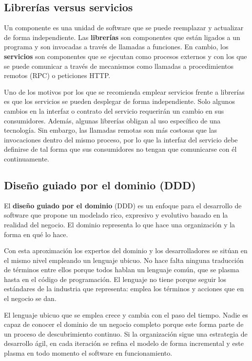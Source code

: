 \documentclass[11pt,spanish,listoffigures,listoftables]{tfgetsinf}
\begin{document}
\subsection{Librerías versus servicios}

Un componente es una unidad de software que se puede reemplazar y actualizar de forma independiente. Las \textbf{librerías} son componentes que están ligados a un programa y son invocadas a través de llamadas a funciones. En cambio, los \textbf{servicios} son componentes que se ejecutan como procesos externos y con los que se puede comunicar a través de mecanismos como llamadas a procedimientos remotos (RPC) o peticiones HTTP. \cite{Lewis2014}

Uno de los motivos por los que se recomienda emplear servicios frente a librerías es que los servicios se pueden desplegar de forma independiente. Solo algunos cambios en la interfaz o contrato del servicio requerirán un cambio en sus consumidores. Además, algunas librerías obligan al uso específico de una tecnología. Sin embargo, las llamadas remotas son más costosas que las invocaciones dentro del mismo proceso, por lo que la interfaz del servicio debe definirse de tal forma que sus consumidores no tengan que comunicarse con él continuamente.

\subsection{Diseño guiado por el dominio (DDD)}

El \textbf{diseño guiado por el dominio} (DDD) es un enfoque para el desarrollo de software que propone un modelado rico, expresivo y evolutivo basado en la realidad del negocio. El dominio representa lo que hace una organización y la forma en qué lo hace.

Con esta aproximación los expertos del dominio y los desarrolladores se sitúan en el mismo nivel empleando un lenguaje ubicuo. No hace falta ninguna traducción de términos entre ellos porque todos hablan un lenguaje común, que se plasma hasta en el código de programación. El lenguaje no tiene porque seguir los estándares de la industria que representa: emplea los términos y acciones que en el negocio se dan. \cite{Vaughn2013}

El lenguaje ubicuo que se emplea crece y cambia con el paso del tiempo. Nadie es capaz de conocer el dominio de un negocio completo porque este forma parte de un proceso de descubrimiento continuo. Si la organización sigue una estrategia de desarrollo ágil, en cada iteración se refina el modelo de forma incremental y este plasma en todo momento el software en funcionamiento.
\end{document}
